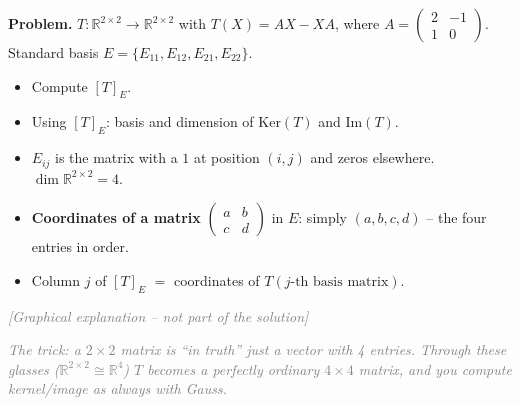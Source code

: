 \documentclass[a4paper,12pt]{article}
\newcommand{\grafik}{\textcolor{gray}{\small\textit{[Graphical explanation -- not part of the solution]}}}
\begin{document}
\textbf{Problem.} $T \colon \mathbb{R}^{2\times 2} \to \mathbb{R}^{2\times 2}$ with $T(X) = AX - XA$, where $A = \begin{pmatrix} 2 & -1 \\ 1 & 0 \end{pmatrix}$.
Standard basis $E = \{E_{11}, E_{12}, E_{21}, E_{22}\}$.
\begin{itemize}[nosep]
\item[(a)] Compute $[T]_E$.
\item[(b)] Using $[T]_E$: basis and dimension of $\text{Ker}(T)$ and $\text{Im}(T)$.
\end{itemize}

\begin{begriffe}
\begin{itemize}[leftmargin=*, nosep]
    \item $E_{ij}$ is the matrix with a $1$ at position $(i,j)$ and zeros elsewhere. $\dim \mathbb{R}^{2\times 2} = 4$.
    \item \textbf{Coordinates of a matrix} $\begin{pmatrix} a & b \\ c & d \end{pmatrix}$ in $E$: simply $(a, b, c, d)$ -- the four entries in order.
    \item Column $j$ of $[T]_E$ $=$ coordinates of $T(\text{$j$-th basis matrix})$.
\end{itemize}
\end{begriffe}

\grafik

\begin{center}
\end{center}

\textcolor{gray}{\small\textit{The trick: a $2\times 2$ matrix is ``in truth'' just a vector with 4 entries. Through these glasses ($\mathbb{R}^{2\times2} \cong \mathbb{R}^4$) $T$ becomes a perfectly ordinary $4\times 4$ matrix, and you compute kernel/image as always with Gauss.}}
\end{document}
